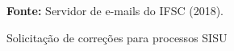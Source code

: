 \begin{figure}[h!]
\centering

\caption{\textmd{Solicitação de correções para processos SISU}}
\label{fig:seres}

\par\medskip\textbf{Fonte:} Servidor de e-mails do IFSC (2018). \par\medskip

\end{figure}

